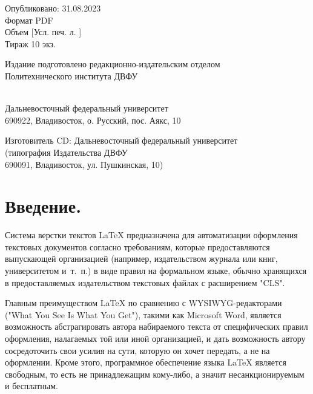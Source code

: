 \documentclass[workbook, draught]{fefudoc}
\begin{document}
\begin{copyrightpage}
\begin{publisherblock}
		\begin{publisherinfo}
			Опубликовано: 31.08.2023 \\
			Формат PDF \\
			Объем \totalpdfsize{} [Усл. печ. л. \totalprintlists*] \\
			Тираж 10 экз.
		\end{publisherinfo}

		\begin{publisherinfo}
			Издание подготовлено редакционно-издательским отделом \\
			Политехнического института ДВФУ \\
			[Кампус ДВФУ, корп. С, каб. 714]\\
		\end{publisherinfo}

		\begin{publisherinfo}
			Дальневосточный федеральный университет \\
			690922, Владивосток, о. Русский, пос. Аякс, 10
		\end{publisherinfo}

		\begin{publisherinfo}
			Изготовитель CD: Дальневосточный федеральный университет \\
			(типография Издательства ДВФУ \\
			690091, Владивосток, ул. Пушкинская, 10)
		\end{publisherinfo}
	\end{publisherblock}
\end{copyrightpage}
\tableofcontents

\chapter*{Введение.}
Система верстки текстов \LaTeX{} \cite{Lamport96} предназначена для автоматизации оформления текстовых документов согласно требованиям, которые предоставляются выпускающей организацией (например, издательством журнала или книг, университетом и~т.~п.) в виде правил на формальном языке, обычно хранящихся в предоставляемых издательством текстовых файлах с расширением "CLS".

Главным преимуществом \LaTeX{} по сравнению с WYSIWYG-редакторами ("What You See Is What You Get"), такими как Microsoft Word, является возможность абстрагировать автора набираемого текста от специфических правил оформления, налагаемых той или иной организацией, и дать возможность автору сосредоточить свои усилия на сути, которую он хочет передать, а не на оформлении.
Кроме этого, программное обеспечение языка \LaTeX{} является свободным, то есть не принадлежащим кому-либо, а значит несанкционируемым и бесплатным.
\end{document}
